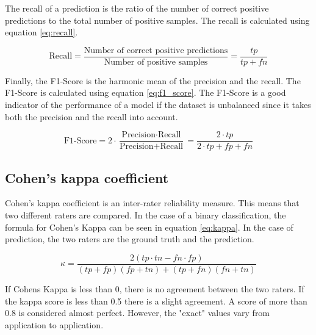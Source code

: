 The recall of a prediction is the ratio of the number of correct positive predictions to the total number of positive samples. The recall is calculated using equation \ref{eq:recall}.

\begin{equation}
    \label{eq:recall}
    \text{Recall} = \frac{\text{Number of correct positive predictions}}{\text{Number of positive samples}} = \frac{tp}{tp + fn}
\end{equation}

Finally, the F1-Score is the harmonic mean of the precision and the recall. The F1-Score is calculated using equation \ref{eq:f1_score}. The F1-Score is a good indicator of the performance of a model if the dataset is unbalanced since it takes both the precision and the recall into account.

\begin{equation}
    \label{eq:f1_score}
    \text{F1-Score} = 2 \cdot \frac{\text{Precision} \cdot \text{Recall}}{\text{Precision} + \text{Recall}} = \frac{2 \cdot tp}{2 \cdot tp + fp + fn}
\end{equation}

\subsection{Cohen's kappa coefficient}

Cohen's kappa coefficient is an inter-rater reliability measure\cite{kappa}. This means that two different raters are compared. In the case of a binary classification, the formula for Cohen's Kappa can be seen in equation \ref{eq:kappa}. In the case of prediction, the two raters are the ground truth and the prediction.

\begin{equation}
    \label{eq:kappa}
    \kappa = \frac{2(tp \cdot tn - fn \cdot fp)}{(tp + fp)(fp+tn) + (tp + fn)(fn + tn)}
\end{equation}

If Cohens Kappa is less than 0, there is no agreement between the two raters. If the kappa score is less than 0.5 there is a slight agreement. A score of more than 0.8 is considered almost perfect. However, the "exact" values vary from application to application.